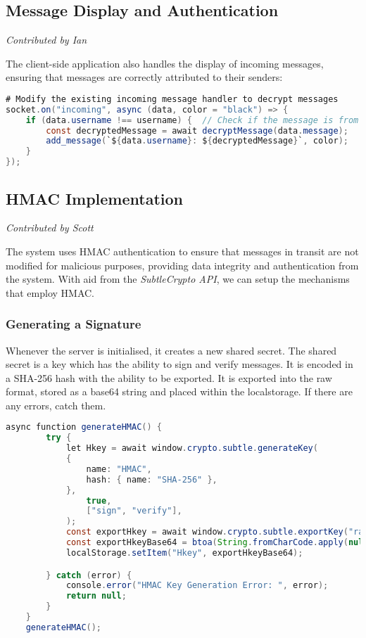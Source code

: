 \documentclass{article}
\begin{document}
\subsection*{Message Display and Authentication}
\textit{Contributed by Ian}

The client-side application also handles the display of incoming messages, ensuring that messages are correctly attributed to their senders:

\begin{lstlisting}[language=Java, caption={Receiving and Decrypting Messages}]
# Modify the existing incoming message handler to decrypt messages
socket.on("incoming", async (data, color = "black") => {
    if (data.username !== username) {  // Check if the message is from another user
        const decryptedMessage = await decryptMessage(data.message);
        add_message(`${data.username}: ${decryptedMessage}`, color);
    }
});
\end{lstlisting}

\subsection*{HMAC Implementation}
\textit{Contributed by Scott}

The system uses HMAC authentication to ensure that messages in transit are not modified for malicious purposes, providing data integrity and authentication from the system. With aid from the \textit{SubtleCrypto API}, we can setup the mechanisms that employ HMAC.

\subsubsection*{Generating a Signature}
Whenever the server is initialised, it creates a new shared secret. The shared secret is a key which has the ability to sign and verify messages. It is encoded in a SHA-256 hash with the ability to be exported. It is exported into the raw format, stored as a base64 string and placed within the localstorage. If there are any errors, catch them.

\begin{lstlisting}[language=Java]
    async function generateHMAC() {
        try {
            let Hkey = await window.crypto.subtle.generateKey(
            {
                name: "HMAC",
                hash: { name: "SHA-256" },
            },
                true,
                ["sign", "verify"],
            );
            const exportHkey = await window.crypto.subtle.exportKey("raw", Hkey)
            const exportHkeyBase64 = btoa(String.fromCharCode.apply(null, [...new Uint8Array(exportHkey)]));
            localStorage.setItem("Hkey", exportHkeyBase64);

        } catch (error) {
            console.error("HMAC Key Generation Error: ", error);
            return null; 
        }
    }
    generateHMAC();
\end{lstlisting}
\end{document}
